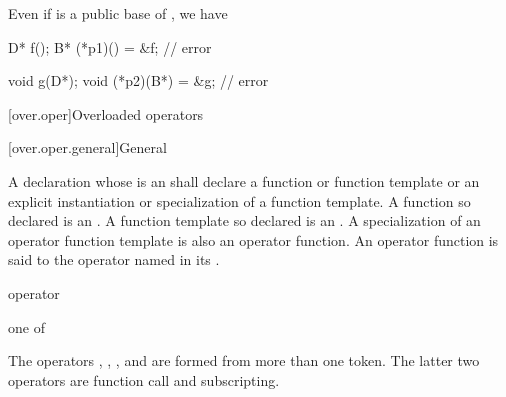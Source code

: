 \pnum
{}%
\begin{note}
Even if  is a public base of ,
we have
\begin{codeblock}
D* f();
B* (*p1)() = &f;                // error

void g(D*);
void (*p2)(B*) = &g;            // error
\end{codeblock}
\end{note}

[over.oper]{Overloaded operators}%

[over.oper.general]{General}%
%
%

\pnum
{}%
A declaration
whose  is an 
shall declare a function or function template or
an explicit instantiation or specialization of a function template.
A function so declared is an .
A function template so declared is
an .
A specialization of an operator function template is also an operator function.
An operator function is said to
the operator named in its
.

\begin{bnf}
\br
     operator
\end{bnf}

\begin{bnf}
\obeyspaces
{} \textnormal{one of}\br
    \br
    \terminal{\~        !        +        -        *        /        \%        \caret{}        \&}\br
    \terminal{|        =        +=       -=       *=       /=       \%=       \caret{}=       \&=}\br
    \terminal{|=       ==       !=       <        >        <=       >=       <=>      \&\&}\br
    \terminal{||       <<       >>       <<=      >>=      ++       --       ,}\br
\end{bnf}
\begin{note}
The operators
,
,
\tcode{()},
and
\tcode{[]}
are formed from more than one token.
The latter two operators are function call
and subscripting.
\end{note}
%
%

